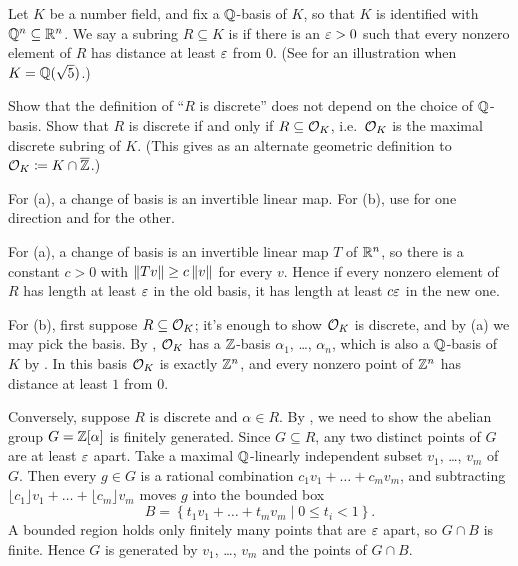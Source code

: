 \begin{dproblem}
	\label{prob:OK_discrete}
	Let $K$ be a number field, and fix a $\mathbb Q$-basis of $K$,
	so that $K$ is identified with $\mathbb Q^n \subseteq \mathbb R^n$.
	We say a subring $R \subseteq K$ is  if there is an $\varepsilon > 0$
	such that every nonzero element of $R$ has distance at least $\varepsilon$ from $0$.
	(See  for an illustration when $K=\mathbb Q(\sqrt5)$.)
	\begin{enumerate}[(a)]
		\ii Show that the definition of ``$R$ is discrete''
		does not depend on the choice of $\mathbb Q$-basis.
		\ii Show that $R$ is discrete if and only if $R \subseteq \mathcal O_K$,
		i.e.\ $\mathcal O_K$ is the maximal discrete subring of $K$.
		(This gives as an alternate geometric definition to $\mathcal O_K \coloneq K \cap \overline{\mathbb Z}$.)
	\end{enumerate}
	\begin{hint}
		For (a), a change of basis is an invertible linear map.
		For (b), use  for one direction
		and  for the other.
	\end{hint}
	\begin{sol}
		For (a), a change of basis is an invertible linear map $T$ of $\mathbb R^n$,
		so there is a constant $c > 0$ with $\left\lVert Tv \right\rVert \ge c \left\lVert v \right\rVert$ for every $v$.
		Hence if every nonzero element of $R$ has length at least $\varepsilon$
		in the old basis, it has length at least $c\varepsilon$ in the new one.

		For (b), first suppose $R \subseteq \mathcal O_K$;
		it's enough to show $\mathcal O_K$ is discrete,
		and by (a) we may pick the basis.
		By ,
		$\mathcal O_K$ has a $\mathbb Z$-basis $\alpha_1$, \dots, $\alpha_n$,
		which is also a $\mathbb Q$-basis of $K$ by .
		In this basis $\mathcal O_K$ is exactly $\mathbb Z^n$,
		and every nonzero point of $\mathbb Z^n$ has distance at least $1$ from $0$.

		Conversely, suppose $R$ is discrete and $\alpha \in R$.
		By , we need to show
		the abelian group $G = \mathbb Z[\alpha]$ is finitely generated.
		Since $G \subseteq R$, any two distinct points of $G$
		are at least $\varepsilon$ apart.
		Take a maximal $\mathbb Q$-linearly independent subset $v_1$, \dots, $v_m$ of $G$.
		Then every $g \in G$ is a rational combination $c_1v_1 + \dots + c_mv_m$,
		and subtracting $\lfloor c_1 \rfloor v_1 + \dots + \lfloor c_m \rfloor v_m$
		moves $g$ into the bounded box
		\[ B = \left\{ t_1v_1 + \dots + t_mv_m \mid 0 \le t_i < 1 \right\}. \]
		A bounded region holds only finitely many points that are $\varepsilon$ apart,
		so $G \cap B$ is finite.
		Hence $G$ is generated by $v_1$, \dots, $v_m$ and the points of $G \cap B$.
	\end{sol}
\end{dproblem}


